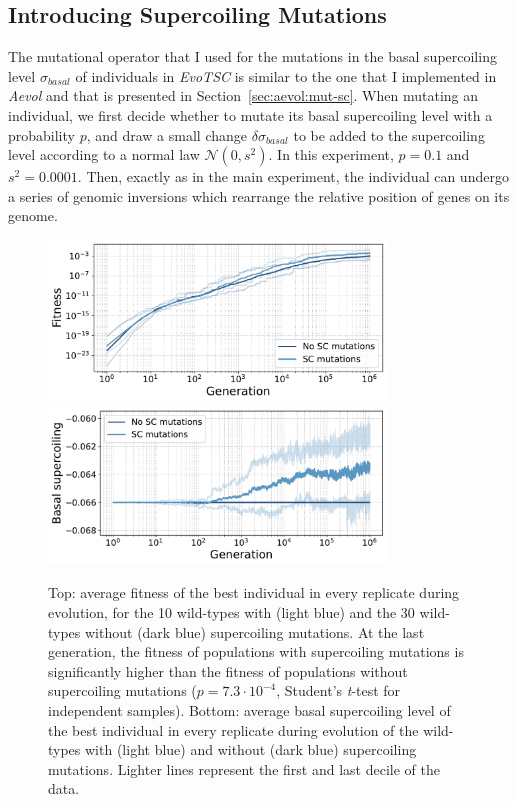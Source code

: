 \subsection{Introducing Supercoiling Mutations}

The mutational operator that I used for the mutations in the basal supercoiling level $\sigma_{basal}$ of individuals in \emph{EvoTSC} is similar to the one that I implemented in \emph{Aevol} and that is presented in Section~\ref{sec:aevol:mut-sc}.
When mutating an individual, we first decide whether to mutate its basal supercoiling level with a probability $p$, and draw a small change $\delta\sigma_{basal}$ to be added to the supercoiling level according to a normal law $\mathcal{N}(0, s^2)$.
In this experiment, $p=0.1$ and $s^2=0.0001$.
Then, exactly as in the main experiment, the individual can undergo a series of genomic inversions which rearrange the relative position of genes on its genome.

\begin{figure}
\centering
\includegraphics[width=0.8\textwidth]{epistasis/img/wt-with-sc/fitness_all_with_main.pdf}
\includegraphics[width=0.8\textwidth]{epistasis/img/wt-with-sc/basal_sc_all.pdf}
\caption[Average basal supercoiling and fitness during evolution of the wild-types, with basal supercoiling level mutations]{Top: average fitness of the best individual in every replicate during evolution, for the 10 wild-types with (light blue) and the 30 wild-types without (dark blue) supercoiling mutations.
At the last generation, the fitness of populations with supercoiling mutations is significantly higher than the fitness of populations without supercoiling mutations ($p = 7.3\cdot10^{-4}$, Student's \emph{t}-test for independent samples).
Bottom: average basal supercoiling level of the best individual in every replicate during evolution of the wild-types with (light blue) and without (dark blue) supercoiling mutations.
Lighter lines represent the first and last decile of the data.}
\label{fig:epistasis:wt-evolution}
\end{figure}

